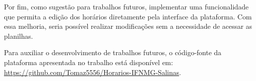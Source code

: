 Por fim, como sugestão para trabalhos futuros, implementar uma funcionalidade que permita a edição dos horários diretamente pela interface da plataforma. Com essa melhoria, seria possível realizar modificações sem a necessidade de acessar as planilhas.

Para auxiliar o desenvolvimento de trabalhos futuros, o código-fonte da plataforma apresentada no trabalho está disponível em: \url{https://github.com/Tomaz5556/Horarios-IFNMG-Salinas}.